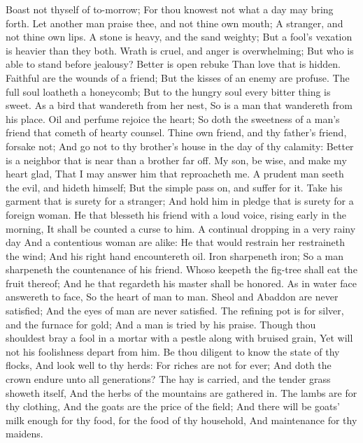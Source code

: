 Boast not thyself of to-morrow; For thou knowest not what a day may bring forth.  Let another man praise thee, and not thine own mouth; A stranger, and not thine own lips.  A stone is heavy, and the sand weighty; But a fool’s vexation is heavier than they both.  Wrath is cruel, and anger is overwhelming; But who is able to stand before jealousy?  Better is open rebuke Than love that is hidden.  Faithful are the wounds of a friend; But the kisses of an enemy are profuse.  The full soul loatheth a honeycomb; But to the hungry soul every bitter thing is sweet.  As a bird that wandereth from her nest, So is a man that wandereth from his place.  Oil and perfume rejoice the heart; So doth the sweetness of a man’s friend that cometh of hearty counsel.  Thine own friend, and thy father’s friend, forsake not; And go not to thy brother’s house in the day of thy calamity: Better is a neighbor that is near than a brother far off.  My son, be wise, and make my heart glad, That I may answer him that reproacheth me.  A prudent man seeth the evil, and hideth himself; But the simple pass on, and suffer for it.  Take his garment that is surety for a stranger; And hold him in pledge that is surety for a foreign woman.  He that blesseth his friend with a loud voice, rising early in the morning, It shall be counted a curse to him.  A continual dropping in a very rainy day And a contentious woman are alike:  He that would restrain her restraineth the wind; And his right hand encountereth oil.  Iron sharpeneth iron; So a man sharpeneth the countenance of his friend.  Whoso keepeth the fig-tree shall eat the fruit thereof; And he that regardeth his master shall be honored.  As in water face answereth to face, So the heart of man to man.  Sheol and Abaddon are never satisfied; And the eyes of man are never satisfied.  The refining pot is for silver, and the furnace for gold; And a man is tried by his praise.  Though thou shouldest bray a fool in a mortar with a pestle along with bruised grain, Yet will not his foolishness depart from him.  Be thou diligent to know the state of thy flocks, And look well to thy herds:  For riches are not for ever; And doth the crown endure unto all generations?  The hay is carried, and the tender grass showeth itself, And the herbs of the mountains are gathered in.  The lambs are for thy clothing, And the goats are the price of the field;  And there will be goats’ milk enough for thy food, for the food of thy household, And maintenance for thy maidens. 


